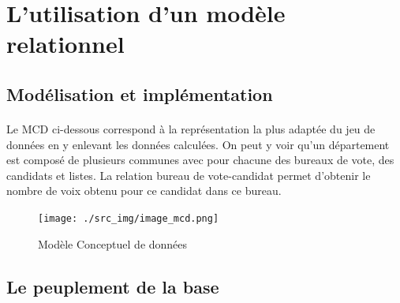 \section{L'utilisation d'un modèle relationnel}

\subsection{Modélisation et implémentation}
\paragraph{}Le \acrshort{MCD} ci-dessous correspond à la représentation la plus adaptée du jeu de données en y enlevant les données calculées. On peut y voir qu'un département est composé de plusieurs communes avec pour chacune des bureaux de vote, des candidats et listes. La relation bureau de vote-candidat permet d'obtenir le nombre de voix obtenu pour ce candidat dans ce bureau.


\begin{figure}[!htp]
  \centering
  \texttt{[image: ./src\_img/image\_mcd.png]}
  \caption{Modèle Conceptuel de données}
  \label{fig:mcd}
\end{figure}

\subsection{Le peuplement de la base}


